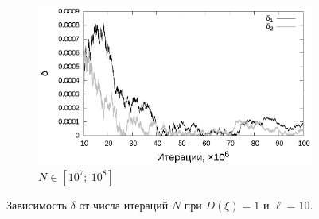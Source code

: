 \documentclass[11pt,a4paper]{article}
\theoremstyle{definition}
\begin{document}
\begin{figure}[h!]
\begin{subfigure}[b]{0.3\textwidth}
    \includegraphics[width=\textwidth]{figs/classic/linear_log_10x_3_samples_10_variance_1_norm.log_end.eps}
    \caption{$N \in [10^7;~10^8]$}
    \label{fig:classic_var1_n10_end}
  \end{subfigure}
  \caption{Зависимость $\delta$ от числа итераций $N$ при $D(\xi) = 1$ и $\ell = 10$.}
  \label{fig:classic_var1_n10}
\end{figure}
\end{document}
